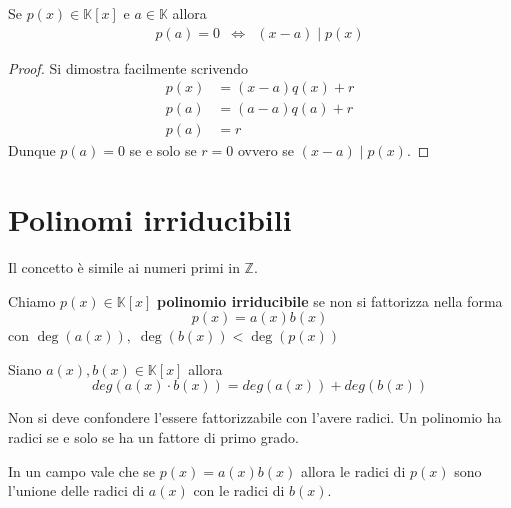 \begin{theorem}
	Se $p(x) \in \mathbb{K}[x]$ e $a \in \mathbb{K}$ allora
	\begin{equation*}
		\begin{array}{ccc}
			p(a) = 0 & \Leftrightarrow & (x - a) \mid p(x)
		\end{array}
	\end{equation*}
	\begin{proof}
		Si dimostra facilmente scrivendo
		\begin{equation*}
			\begin{array}{ll}
				p(x) & = (x - a) q(x) + r \\
				p(a) & = (a - a) q(a) + r \\
				p(a) & = r
			\end{array}
		\end{equation*}
		Dunque $p(a) = 0$ se e solo se $r = 0$ ovvero se $(x - a) \mid p(x)$.
	\end{proof}
\end{theorem}

\section{Polinomi irriducibili}
Il concetto \`e simile ai numeri primi in $\mathbb{Z}$.

\begin{definition}
	Chiamo $p(x) \in \mathbb{K}[x]$ \textbf{polinomio irriducibile} se non si fattorizza nella forma
	\[ p(x) = a(x)b(x) \]
	con $\deg(a(x)),\; \deg(b(x)) < \deg(p(x))$
\end{definition}

\begin{observation}
	Siano $a(x), b(x) \in \mathbb{K}[x]$ allora
	\begin{equation*}
		deg(a(x) \cdot b(x)) = deg(a(x)) + deg(b(x))
	\end{equation*}
\end{observation}

\begin{observation}
	Non si deve confondere l'essere fattorizzabile con l'avere radici. Un polinomio ha
	radici se e solo se ha un fattore di primo grado.
\end{observation}

\begin{observation}
	In un campo vale che se $p(x) = a(x)b(x)$ allora le radici di $p(x)$ sono
	l'unione delle radici di $a(x)$ con le radici di $b(x)$.
\end{observation}

